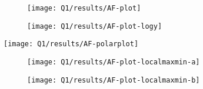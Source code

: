 \documentclass[12pt,onecolumn,a4paper]{article}
\begin{document}
\begin{figure}[h]
\begin{subfigure}{\linewidth}
\begin{adjustbox}{scale=1.2}
			\end{adjustbox}
			\caption{}
		\end{subfigure}
		\caption{}
	\end{figure}
	
	
	\begin{figure}[h]
		\begin{subfigure}{.48\linewidth}
			\centering
			\texttt{[image: Q1/results/AF-plot]}
			\caption{}
			\label{fig:af-plot}
		\end{subfigure}
		\hfill
		\begin{subfigure}{.48\linewidth}
			\centering
			\texttt{[image: Q1/results/AF-plot-logy]}
			\caption{}
			\label{fig:af-plot-logy}
		\end{subfigure}
		\caption{
			\space
		}
	\end{figure}
	
	
	\begin{figure}
		\centering
		\texttt{[image: Q1/results/AF-polarplot]}
		\caption{}
		\label{fig:af-polarplot}
	\end{figure}
	
	
	
\begin{figure}
	\centering
	\begin{subfigure}{\linewidth}
		\centering
		\texttt{[image: Q1/results/AF-plot-localmaxmin-a]}
		\caption{}
		\label{fig:af-plot-localmaxmin-a}
	\end{subfigure}
	
	\begin{subfigure}{\linewidth}
		\centering
		\texttt{[image: Q1/results/AF-plot-localmaxmin-b]}
		\caption{}
		\label{fig:af-plot-localmaxmin-b}
	\end{subfigure}
	
	\caption{
	\space
	}
\end{figure}
	
\end{document}
